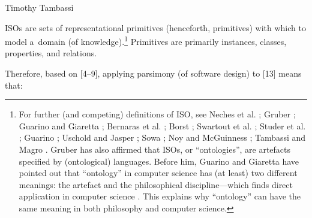 \begin{artengenv}{Timothy Tambassi}
\begin{enumerate}[label={[\arabic*]}]
\item ISOs are sets of representational primitives (henceforth, primitives) with which to model a~domain (of knowledge).\footnote{For further (and competing) definitions of ISO, see Neches et al. 
\parencite*[][]{neches_enabling_1991}; %
 Gruber 
\parencite*[][]{gruber_translation_1993}; %
 Guarino and Giaretta 
\parencite*[][]{guarino_ontologies_1995}; %
 Bernaras et al. 
\parencite*[][]{bernaras_building_1996}; %
 Borst 
\parencite*[][]{borst_construction_1997}; %
 Swartout et al. 
\parencite*[][]{swartout_toward_1997}; %
 Studer et al. 
\parencite*[][]{studer_knowledge_1998}; %
 Guarino 
\parencite*[][]{guarino_formal_1998}; %
 Uschold and Jasper 
\parencite*[][]{uschold_framework_1999}; %
 Sowa 
\parencite*[][]{sowa_guided_2005}; %
 Noy and McGuinness 
\parencite*[][]{noy_ontology_2003}; %
 Tambassi and Magro 
\parencite*[][]{tambassi_ontologie_2015}. %
 Gruber 
\parencite*[][p.1964]{liu_ontology_2009} %
 has also affirmed that ISOs, or ``ontologies'', are artefacts specified by (ontological) languages. Before him, Guarino and Giaretta 
\parencite*[][]{guarino_ontologies_1995} %
 have pointed out that ``ontology'' in computer science has (at least) two different meanings: the artefact and the philosophical discipline---which finds direct application in computer science 
\parencites[see, for example][]{turner_computational_2018}[][]{krzanowski_meta-ontology_2022}%
. This explains why ``ontology'' can have the same meaning in both philosophy and computer science. } Primitives are primarily instances, classes, properties, and relations.\footnotemark

\end{enumerate}

Therefore, based on [4–9], applying parsimony (of software design) to [13] means that:

\setcounter{saveenumtambassi}{\value{enumi}}

\begin{enumerate}[label={[\arabic*]}]


\end{enumerate}
\end{artengenv}
